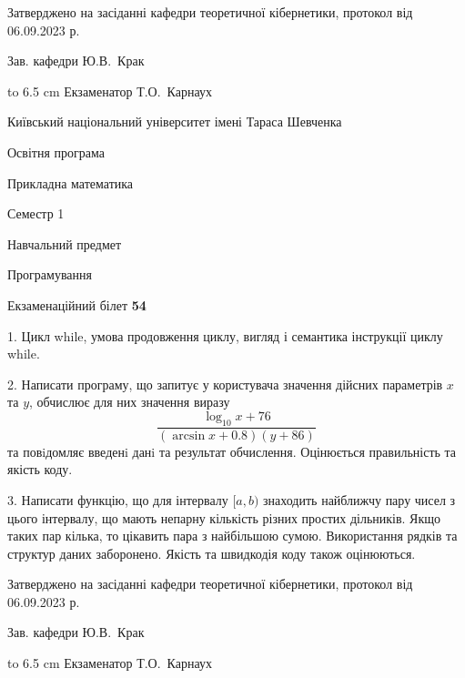 \documentclass[12pt, ukrainian]{article}
\begin{document}
{\smallskip\smallskip \begin {scriptsize} Затверджено на засіданні кафедри теоретичної кібернетики, протокол   від   06.09.2023 р.\par\smallskip\smallskip\smallskip\smallskip
{\parbox {6.5 cm} {Зав. кафедри \dotfill Ю.В.~Крак}}\hspace {0.7cm} {\hbox to 6.5 cm { Екзаменатор \dotfill Т.О.~Карнаух}} \end{scriptsize}}
\vspace{0.9cm}
{{\begin {scriptsize}\par
{ \center  Київський національний університет імені Тараса Шевченка \par}
{\parbox {5 cm}{Освітня програма \hfill}{\parbox {7 cm}{Прикладна математика\hfill}}\parbox {6 cm}{\hfill Семестр 1}}\par
{\parbox {5 cm} {Навчальний предмет \hfill}\parbox {7 cm}{Програмування \hfill}\parbox {6cm}{\hfill}\par}\vspace{-15pt} \end{scriptsize}}{\center Екзаменаційний білет \No \textbf { 54 }\par}}
{%
1. Цикл while, умова продовження циклу, вигляд і семантика інструкції циклу while.%
\par
2. Написати програму, що запитує у користувача значення дійсних параметрів $x$ та $y$, обчислює для них значення виразу 
$$\frac{\log_{10} x + 76}{(\arcsin x + 0.8) (y + 86)}$$ 
та повiдомляє введенi данi та результат обчислення.
 Оцінюється правильність та якість коду.

\par
3. Написати функцію, що для інтервалу $[a, b)$ знаходить найближчу пару чисел з цього інтервалу, що мають непарну кількість різних простих дільників. Якщо таких пар кілька, то цікавить пара з найбільшою сумою.  Використання рядків та структур даних заборонено. Якість та швидкодія коду також оцінюються. 

}
{\smallskip\smallskip \begin {scriptsize} Затверджено на засіданні кафедри теоретичної кібернетики, протокол   від   06.09.2023 р.\par\smallskip\smallskip\smallskip\smallskip
{\parbox {6.5 cm} {Зав. кафедри \dotfill Ю.В.~Крак}}\hspace {0.7cm} {\hbox to 6.5 cm { Екзаменатор \dotfill Т.О.~Карнаух}} \end{scriptsize}}
\newpage
\end{document}
